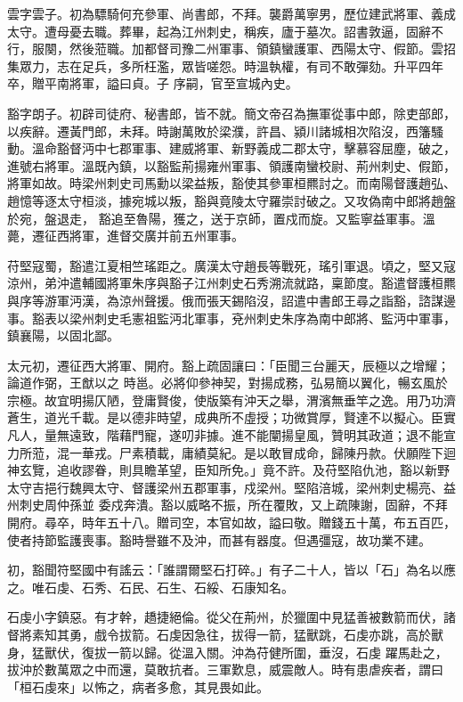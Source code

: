 \begin{pinyinscope}
 雲字雲子。初為驃騎何充參軍、尚書郎，不拜。襲爵萬寧男，歷位建武將軍、義成太守。遭母憂去職。葬畢，起為江州刺史，稱疾，廬于墓次。詔書敦逼，固辭不行，服闋，然後蒞職。加都督司豫二州軍事、領鎮蠻護軍、西陽太守、假節。雲招集眾力，志在足兵，多所枉濫，眾皆嗟怨。時溫執權，有司不敢彈劾。升平四年卒，贈平南將軍，謚曰貞。子
 序嗣，官至宣城內史。



 豁字朗子。初辟司徒府、秘書郎，皆不就。簡文帝召為撫軍從事中郎，除吏部郎，以疾辭。遷黃門郎，未拜。時謝萬敗於梁濮，許昌、潁川諸城相次陷沒，西籓騷動。溫命豁督沔中七郡軍事、建威將軍、新野義成二郡太守，擊慕容屈塵，破之，進號右將軍。溫既內鎮，以豁監荊揚雍州軍事、領護南蠻校尉、荊州刺史、假節，將軍如故。時梁州刺史司馬勳以梁益叛，豁使其參軍桓羆討之。而南陽督護趙弘、趙憶等逐太守桓淡，據宛城以叛，豁與竟陵太守羅崇討破之。又攻偽南中郎將趙盤於宛，盤退走，
 豁追至魯陽，獲之，送于京師，置戍而旋。又監寧益軍事。溫薨，遷征西將軍，進督交廣并前五州軍事。



 苻堅寇蜀，豁遣江夏相竺瑤距之。廣漢太守趙長等戰死，瑤引軍退。頃之，堅又寇涼州，弟沖遣輔國將軍朱序與豁子江州刺史石秀溯流就路，稟節度。豁遣督護桓羆與序等游軍沔漢，為涼州聲援。俄而張天錫陷沒，詔遣中書郎王尋之詣豁，諮謀邊事。豁表以梁州刺史毛憲祖監沔北軍事，兗州刺史朱序為南中郎將、監沔中軍事，鎮襄陽，以固北鄙。



 太元初，遷征西大將軍、開府。豁上疏固讓曰：「臣聞三台麗天，辰極以之增耀；論道作弼，王猷以之
 時邕。必將仰參神契，對揚成務，弘易簡以翼化，暢玄風於宗極。故宜明揚仄陋，登庸賢俊，使版築有沖天之舉，渭濱無垂竿之逸。用乃功濟蒼生，道光千載。是以德非時望，成典所不虛授；功微賞厚，賢達不以擬心。臣實凡人，量無遠致，階藉門寵，遂叨非據。進不能闡揚皇風，贊明其政道；退不能宣力所蒞，混一華戎。尸素積載，庸績莫紀。是以敢冒成命，歸陳丹款。伏願陛下迴神玄覽，追收謬眷，則具瞻革望，臣知所免。」竟不許。及苻堅陷仇池，豁以新野太守吉挹行魏興太守、督護梁州五郡軍事，戍梁州。堅陷涪城，梁州刺史楊亮、益州刺史周仲孫並
 委戍奔潰。豁以威略不振，所在覆敗，又上疏陳謝，固辭，不拜開府。尋卒，時年五十八。贈司空，本官如故，謚曰敬。贈錢五十萬，布五百匹，使者持節監護喪事。豁時譽雖不及沖，而甚有器度。但遇彊寇，故功業不建。



 初，豁聞符堅國中有謠云：「誰謂爾堅石打碎。」有子二十人，皆以「石」為名以應之。唯石虔、石秀、石民、石生、石綏、石康知名。



 石虔小字鎮惡。有才幹，趫捷絕倫。從父在荊州，於獵圍中見猛善被數箭而伏，諸督將素知其勇，戲令拔箭。石虔因急往，拔得一箭，猛獸跳，石虔亦跳，高於獸身，猛獸伏，復拔一箭以歸。從溫入關。沖為苻健所圍，垂沒，石虔
 躍馬赴之，拔沖於數萬眾之中而還，莫敢抗者。三軍歎息，威震敵人。時有患虐疾者，謂曰「桓石虔來」以怖之，病者多愈，其見畏如此。




\end{pinyinscope}
